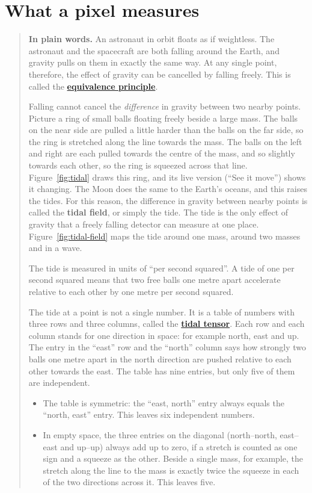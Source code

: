 \section{What a pixel measures}\label{sec:pixel}

\begin{quote}
\textbf{In plain words.} An astronaut in orbit floats as if weightless. The
astronaut and the spacecraft are both falling around the Earth, and gravity
pulls on them in exactly the same way. At any single point, therefore, the
effect of gravity can be cancelled by falling freely. This is called the
\textbf{\href{https://en.wikipedia.org/wiki/Equivalence_principle}{equivalence
principle}}.

Falling cannot cancel the \emph{difference} in gravity between two nearby
points. Picture a ring of small balls floating freely beside a large mass. The
balls on the near side are pulled a little harder than the balls on the far
side, so the ring is stretched along the line towards the mass. The balls on
the left and right are each pulled towards the centre of the mass, and so
slightly towards each other, so the ring is squeezed across that line. Figure~\ref{fig:tidal} draws this ring, and its live version (``See it move'') shows it changing. The
Moon does the same to the Earth's oceans, and this raises the tides. For this
reason, the difference in gravity between nearby points is called the
\textbf{tidal field}, or simply the tide. The tide is the only effect of
gravity that a freely falling detector can measure at one place. Figure~\ref{fig:tidal-field} maps the tide around one mass, around two masses and in a wave.

The tide is measured in units of ``per second squared''. A tide of one per
second squared means that two free balls one metre apart accelerate relative
to each other by one metre per second squared.

The tide at a point is not a single number. It is a table of numbers with
three rows and three columns, called the
\textbf{\href{https://en.wikipedia.org/wiki/Tidal_tensor}{tidal tensor}}. Each
row and each column stands for one direction in space: for example north, east
and up. The entry in the ``east'' row and the ``north'' column says how
strongly two balls one metre apart in the north direction are pushed relative
to each other towards the east. The table has nine entries, but only five of
them are independent.
\begin{itemize}
\item The table is symmetric: the ``east, north'' entry always equals the
``north, east'' entry. This leaves six independent numbers.
\item In empty space, the three entries on the diagonal (north--north,
east--east and up--up) always add up to zero, if a stretch is counted as one
sign and a squeeze as the other. Beside a single mass, for example, the stretch
along the line to the mass is exactly twice the squeeze in each of the two
directions across it. This leaves five.
\end{itemize}


\end{quote}
